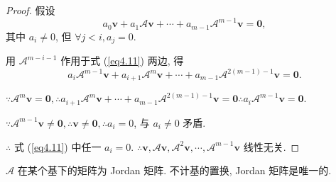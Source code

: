 \documentclass[color=black,device=normal,lang=cn,mode=geye]{elegantnote}
\begin{document}
\begin{proof}
    假设
    \begin{equation}\label{eq4.11}
        a_0\boldsymbol{v}+a_1\mathcal{A}\boldsymbol{v}+\cdots+a_{m-1}\mathcal{A}^{m-1}\boldsymbol{v}=\boldsymbol{0},
    \end{equation}
    其中 $a_i\neq0$, 但 $\forall j<i,a_j=0$.

    用 $\mathcal{A}^{m-i-1}$ 作用于式 (\ref{eq4.11}) 两边, 得
    \[a_i\mathcal{A}^{m-1}\boldsymbol{v}+a_{i+1}\mathcal{A}^m\boldsymbol{v}+\cdots+a_{m-1}\mathcal{A}^{2(m-1)-1}\boldsymbol{v}=\boldsymbol{0}.\]

    $\because\mathcal{A}^m\boldsymbol{v}=\boldsymbol{0},\therefore a_{i+1}\mathcal{A}^m\boldsymbol{v}+\cdots+a_{m-1}\mathcal{A}^{2(m-1)-1}\boldsymbol{v}=\boldsymbol{0}\therefore a_i\mathcal{A}^{m-1}\boldsymbol{v}=\boldsymbol{0}$.

    $\because\mathcal{A}^{m-1}\boldsymbol{v}\neq\boldsymbol{0},\therefore\boldsymbol{v}\neq\boldsymbol{0},\therefore a_i=0$, 与 $a_i\neq0$ 矛盾.
    
    $\therefore$ 式 (\ref{eq4.11}) 中任一 $a_i=0$. $\therefore\boldsymbol{v},\mathcal{A}\boldsymbol{v},\mathcal{A}^2\boldsymbol{v},\cdots,\mathcal{A}^{m-1}\boldsymbol{v}$ 线性无关.
\end{proof}
\begin{theorem}\label{t4.4}
    $\mathcal{A}$ 在某个基下的矩阵为 Jordan 矩阵. 不计基的置换, Jordan 矩阵是唯一的.
\end{theorem}
\end{document}
